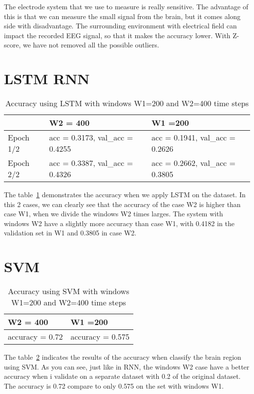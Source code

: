The electrode system that we use to measure is really sensitive. The advantage of this is that we can measure the small signal from the brain, but it comes along side with disadvantage. The surrounding environment with electrical field can impact the recorded EEG signal, so that it makes the accuracy lower. With Z-score, we have not removed all the possible outliers.

\section{LSTM RNN}

\begin{table}[h]
\centering
\begin{tabular}{|l|l|l|}
\hline
          & W2 = 400                        & W1 =200                         \\ \hline
Epoch 1/2 & acc = 0.3173, val\_acc = 0.4255 & acc = 0.1941, val\_acc = 0.2626 \\ \hline
Epoch 2/2 & acc = 0.3387, val\_acc = 0.4326 & acc = 0.2662, val\_acc = 0.3805 \\ \hline
\end{tabular}
\caption{Accuracy using LSTM with windows W1=200 and W2=400 time steps}
\label{table:LSTM}
\end{table}

The table~\ref{table:LSTM} demonstrates the accuracy when we apply LSTM on the dataset. In this 2 cases, we can clearly see that the accuracy  of the case W2 is higher than case W1, when we divide the windows W2 times larges. The system with windows W2 have a slightly more accuracy than case W1, with 0.4182 in the validation set in W1 and 0.3805 in case W2. 

\section{SVM}

\begin{table}[h]
\centering
\begin{tabular}{|l|l|}
\hline
W2 = 400        & W1 =200          \\ \hline
accuracy = 0.72 & accuracy = 0.575 \\ \hline
\end{tabular}
\caption{Accuracy using SVM with windows W1=200 and W2=400 time steps}
\label{table:SVM}
\end{table}

The table~\ref{table:SVM} indicates the results of the accuracy when classify the brain region using SVM. As you can see, just like in RNN, the windows W2 case have a better accuracy when i validate on a separate dataset with 0.2 of the original dataset. The accuracy is 0.72 compare to only 0.575 on the set with windows W1. 

